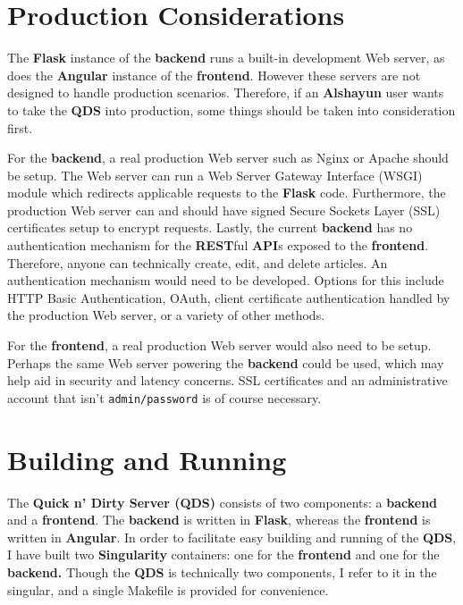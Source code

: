 \documentclass[12pt]{report}
\begin{document}
    \section{Production Considerations}
    
The \textbf{Flask} instance of the \textbf{backend} runs a built-in development
Web server, as does the \textbf{Angular} instance of the \textbf{frontend}.
However these servers are not designed to handle production scenarios.
Therefore, if an \textbf{Alshayun} user wants to take the \textbf{QDS} into
production, some things should be taken into consideration first.

For the \textbf{backend}, a real production Web server such as Nginx or Apache
should be setup. The Web server can run a Web Server Gateway Interface (WSGI)
module which redirects applicable requests to the \textbf{Flask} code.
Furthermore, the production Web server can and should have signed Secure Sockets
Layer (SSL) certificates setup to encrypt requests. Lastly, the current
\textbf{backend} has no authentication mechanism for the \textbf{REST}ful
\textbf{API}s exposed to the \textbf{frontend}. Therefore, anyone can
technically create, edit, and delete articles. An authentication mechanism would
need to be developed. Options for this include HTTP Basic Authentication, OAuth,
client certificate authentication handled by the production Web server, or a
variety of other methods.

For the \textbf{frontend}, a real production Web server would also need to be
setup. Perhaps the same Web server powering the \textbf{backend} could be used,
which may help aid in security and latency concerns. SSL certificates and an
administrative account that isn't \texttt{admin/password} is of course
necessary.

    \section{Building and Running}

The \textbf{Quick n' Dirty Server (QDS)} consists of two components: a
\textbf{backend} and a \textbf{frontend}. The \textbf{backend} is written in
\textbf{Flask}, whereas the \textbf{frontend} is written in \textbf{Angular}. In
order to facilitate easy building and running of the \textbf{QDS}, I have built
two \textbf{Singularity} containers: one for the \textbf{frontend} and one for
the \textbf{backend.} Though the \textbf{QDS} is technically two components, I
refer to it in the singular, and a single Makefile is provided for convenience.
\end{document}
